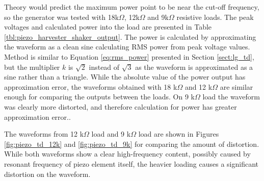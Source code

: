 Theory would predict the maximum power point to be near the cut-off frequency, so the generator was tested with 18k$\Omega$, 12k$\Omega$ and 9k$\Omega$ resistive loads. The peak voltages and calculated power into the load are presented in Table \ref{tbl:piezo_harvester_shaker_output}. The power is calculated by approximating the waveform as a clean sine calculating RMS power from peak voltage values. Method is similar to Equation \eqref{eq:rms_power} presented in Section \ref{sect:lg_td}, but the multiplier $k$ is $\sqrt{2}$ instead of $\sqrt{3}$ as the waveform is approximated as a sine rather than a triangle. While the absolute value of the power output has approximation error, the waveforms obtained with 18 k$\Omega$ and 12 k$\Omega$ are similar enough for comparing the outputs between the loads. On 9 k$\Omega$ load the waveform was clearly more distorted, and therefore calculation for power has greater approximation error..

\begin{table}[htb]
\caption{\label{tbl:piezo_harvester_shaker_output} Output power of piezo harvester at 18 k$\Omega$, 12 k$\Omega$ and 9 k$\Omega$ loads.}
\begin{center}
\end{center}
\end{table}

The waveforms from 12 k$\Omega$ load and 9 k$\Omega$ load are shown in Figures \ref{fig:piezo_td_12k} and \ref{fig:piezo_td_9k} for comparing the amount of distortion. While both waveforms show a clear high-frequency content, possibly caused by resonant frequency of piezo element itself, the heavier loading causes a significant distortion on the waveform.


